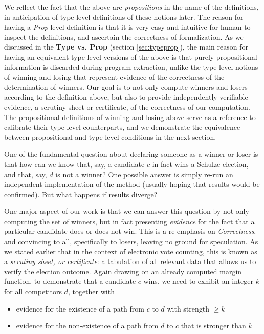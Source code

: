 \noindent
We reflect the fact that the above are \emph{propositions} in
the name of the definitions, in anticipation of type-level
definitions of these notions later. The reason for having a \textit{Prop} level definition is that 
 it is very easy  and intuitive for human to inspect the definitions, and ascertain the correctness of formalization.
As we discussed in the
\textbf{Type vs. Prop} (section \ref{sec:typeprop}), the main reason 
for having an equivalent
type-level versions of the above is that purely propositional
information is discarded during program extraction, unlike
the type-level notions of winning and losing that represent evidence
of the correctness of the determination of winners. Our goal is to 
not only compute winners and losers according to the
definition above, but also to provide independently verifiable
evidence, a scrutiny sheet or certificate, of the correctness of our computation.
The propositional
definitions of winning and losing above serve as a reference to
calibrate their type level counterparts, and we demonstrate the
equivalence between propositional and type-level conditions in the
next section. 


\label{sec:prop-type}
One of the fundamental question about declaring someone 
as a winner or loser is that 
how can we know that, say, a candidate $c$ in fact wins a
Schulze election, and that, say, $d$ is not a winner? One possible 
answer is simply  re-run an independent implementation of the method
(usually hoping that results would be confirmed). But what happens
if results diverge?  

One major aspect of our work is that we can answer this question
by not only computing the set of winners, but in fact presenting
\emph{evidence} for the fact that a particular
candidate does or does not
win. This is a re-emphasis on \emph{Correctness},
and convincing to all, specifically to losers, leaving  no ground for speculation. 
As we stated earlier that in the context of
electronic vote counting, this is known as a
\emph{scrutiny sheet, or certificate}: a tabulation of all relevant data that allows
us to verify the election outcome.
Again drawing on an already computed margin function, to
demonstrate that a candidate $c$ wins, we need to exhibit an integer
$k$ for all competitors $d$, together with
\begin{itemize}
  \item evidence for the existence of a path from $c$ to $d$ with
  strength $\geq k$
  \item evidence for the non-existence of a path from $d$ to $c$
  that is stronger than $k$
\end{itemize}


